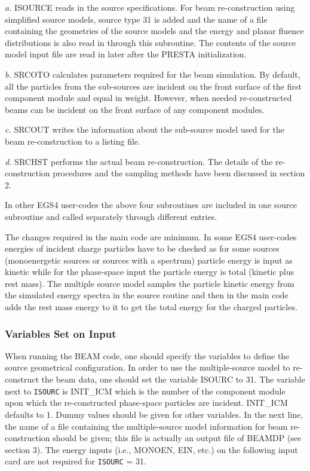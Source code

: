 \documentclass[12pt,twoside]{article}
\begin{document}
{\noindent\it a.} ISOURCE reads in the source specifications. For beam
re-construction using simplified source models, source type 31 is added
and the name of a file containing the geometries of the source models and
the energy and planar fluence distributions is also read in through this
subroutine. The contents of the source model input file are read in later
after the PRESTA initialization.

{\noindent\it b.} SRCOTO calculates parameters required for the beam
simulation. By default, all the particles from the sub-sources are
incident on the front surface of the first component module and equal in
weight. However, when needed re-constructed beams can be incident on the
front surface of any component modules.

{\noindent\it c.} SRCOUT writes the information about the sub-source model
used for the beam re-construction to a listing file.

{\noindent\it d.} SRCHST performs the actual beam re-construction. The
details of the re-construction procedures and the sampling methods have
been discussed in section 2.

In other EGS4 user-codes the above four subroutines are included in one source subroutine and called separately through different entries.

The changes required in the main code are minimum. In some EGS4  user-codes energies of incident charge particles have to be checked as for some sources (monoenergetic sources or sources with a spectrum) particle energy is input as kinetic while for the phase-space input the particle energy is total (kinetic plus rest mass). The multiple source model samples the particle kinetic energy from the simulated energy spectra in the source routine and then in the main code adds the rest mass energy to it to get the total energy for the charged particles.

\subsubsection{Variables Set on Input}

When running the BEAM code, one should specify the variables
to define the source geometrical configuration. In order to use the
multiple-source model to re-construct the beam data, one should set the
variable ISOURC to 31. The variable next to {\tt ISOURC} is
INIT\_ICM which is the number of the component module upon which the
re-constructed phase-space particles are incident. INIT\_ICM defaults to
1. Dummy values should be given for other variables. In the next line, the
name of a file containing the multiple-source model information for beam
re-construction should be given; this file is actually an output file of
BEAMDP (see section 3). The energy inputs (i.e., MONOEN, EIN, etc.) on the
following input card are not required for {\tt ISOURC} = 31.
\end{document}
